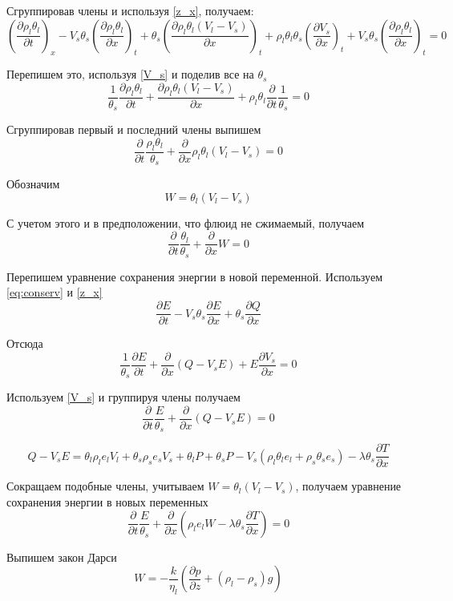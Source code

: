 \documentclass[12pt]{article}
\newcommand{\pd}[2]{\frac{\partial #1}{\partial #2}}
\begin{document}
Сгруппировав члены и используя \eqref{z_x}, получаем:
$$
\left(\pd{\rho_l\theta_l}{t}\right)_x - V_s\theta_s \left(\pd{\rho_l\theta_l}{x}\right)_t + \theta_s\left(\pd{\rho_l\theta_l(V_l - V_s)}{x}\right)_t + \rho_l\theta_l\theta_s\left(\pd{V_s}{x}\right)_t + V_s\theta_s \left(\pd{\rho_l\theta_l}{x}\right)_t = 0
$$

Перепишем это, используя \eqref{V_s} и поделив все на $\theta_s$
$$
\frac{1}{\theta_s}\pd{\rho_l\theta_l}{t} + \pd{\rho_l\theta_l(V_l-V_s)}{x} + \rho_l\theta_l\pd{}{t}\frac{1}{\theta_s} = 0
$$

Сгруппировав первый и последний члены выпишем
\begin{equation}
\pd{}{t}\frac{\rho_l\theta_l}{\theta_s} + \pd{}{x}\rho_l\theta_l(V_l - V_s) = 0
\label{filtr_compr}
\end{equation}

Обозначим 
\begin{equation}
W = \theta_l (V_l - V_s )
\label{W_filtr}
\end{equation}

С учетом этого и в предположении, что флюид не сжимаемый, получаем
\begin{equation}
\pd{}{t}\frac{\theta_l}{\theta_s} + \pd{}{x}W = 0
\label{filtr_compr}
\end{equation}

Перепишем уравнение сохранения энергии в новой переменной. Используем \eqref{eq:conserv} и \eqref{z_x}
$$
\pd{E}{t} - V_s\theta_s\pd{E}{x} + \theta_s\pd{Q}{x}
$$

Отсюда
$$
\frac{1}{\theta_s}\pd{E}{t} + \pd{}{x}(Q-V_s E) + E\pd{V_s}{x} = 0
$$

Используем \eqref{V_s} и группируя члены получаем
\begin{equation}
\pd{}{t}\frac{E}{\theta_s} + \pd{}{x}(Q - V_s E) = 0
\end{equation}

$$
Q-V_s E = \theta_l\rho_l e_l V_l + \theta_s\rho_s e_s V_s + \theta_l P + \theta_s P -V_s(\rho_l\theta_l e_l +\rho_s\theta_s e_s) - \lambda\theta_s\pd{T}{x}
$$

Сокращаем подобные члены, учитываем $W = \theta_l (V_l - V_s )$, получаем уравнение сохранения энергии в новых переменных
\begin{equation}
\pd{}{t}\frac{E}{\theta_s} + \pd{}{x}(\rho_l e_l W - \lambda\theta_s\pd{T}{x}) = 0
\label{eq:conserv_new}
\end{equation}

Выпишем закон Дарси
\begin{equation}
W= -\frac{k}{\eta_l}\left(\pd{p}{z} + (\rho_l-\rho_s)g \right)
\label{Darsi}
\end{equation}
\newpage
\end{document}
